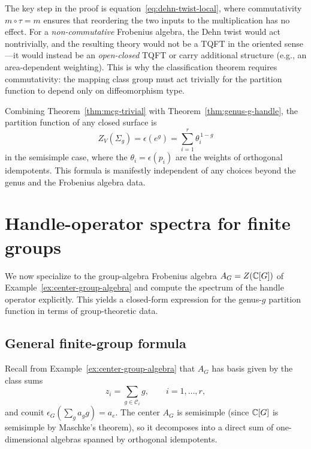 \begin{remark}\label{rem:commutativity-essential}
The key step in the proof is equation~\eqref{eq:dehn-twist-local}, where commutativity $m \circ \tau = m$ ensures that reordering the two inputs to the multiplication has no effect. For a \emph{non-commutative} Frobenius algebra, the Dehn twist would act nontrivially, and the resulting theory would not be a TQFT in the oriented sense---it would instead be an \emph{open-closed} TQFT or carry additional structure (e.g., an area-dependent weighting). This is why the classification theorem requires commutativity: the mapping class group must act trivially for the partition function to depend only on diffeomorphism type.
\end{remark}

\begin{remark}\label{rem:partition-revisited}
Combining Theorem~\ref{thm:mcg-trivial} with Theorem~\ref{thm:genus-g-handle}, the partition function of any closed surface is
\begin{equation}\label{eq:partition-genus-only}
Z_V(\Sigma_g) = \epsilon(e^g) = \sum_{i=1}^r \theta_i^{\,1-g}
\end{equation}
in the semisimple case, where the $\theta_i = \epsilon(p_i)$ are the weights of orthogonal idempotents. This formula is manifestly independent of any choices beyond the genus and the Frobenius algebra data.
\end{remark}


\section{Handle-operator spectra for finite groups}\label{appsec:handle-spectrum}

We now specialize to the group-algebra Frobenius algebra $A_G = Z(\mathbb{C}[G])$ of Example~\ref{ex:center-group-algebra} and compute the spectrum of the handle operator explicitly. This yields a closed-form expression for the genus-$g$ partition function in terms of group-theoretic data.

\subsection{General finite-group formula}

Recall from Example~\ref{ex:center-group-algebra} that $A_G$ has basis given by the class sums
\begin{equation}\label{eq:class-sums-app}
z_i = \sum_{g \in \mathcal{C}_i} g, \qquad i = 1, \dots, r,
\end{equation}
and counit $\epsilon_G(\sum_g a_g g) = a_e$. The center $A_G$ is semisimple (since $\mathbb{C}[G]$ is semisimple by Maschke's theorem), so it decomposes into a direct sum of one-dimensional algebras spanned by orthogonal idempotents.

